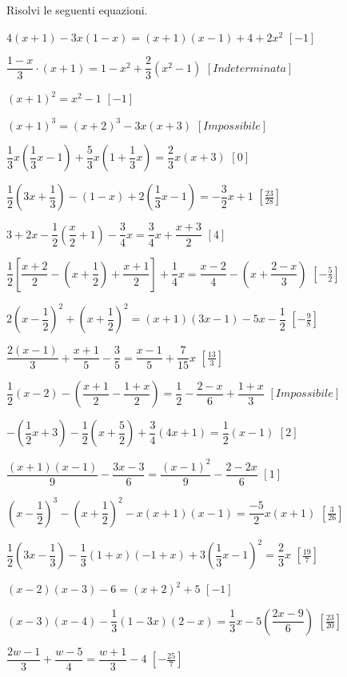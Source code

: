\begin{esercizio}[\Ast]
\label{ese:13.38}
Risolvi le seguenti equazioni.
\begin{enumeratea}
\spazielenx
 \item $4(x+1)-3x(1-x)=(x+1)(x-1)+4+2x^{2}$ \hfill $\left[-1\right]$
 \item $\dfrac{1-x}{3}\cdot (x+1)=1-x^{2}+\dfrac{2}{3}\left(x^{2}-1\right)$ 
  \hfill $\left[Indeterminata\right]$
 \item $(x+1)^{2}=x^{2}-1$ \hfill $\left[-1\right]$
 \item $(x+1)^{3}=(x+2)^{3}-3x(x+3)$ \hfill $\left[Impossibile\right]$
 \item $\dfrac{1}{3}x\left(\dfrac{1}{3}x-1\right)+
        \dfrac{5}{3}x\left(1+\dfrac{1}{3}x\right)=\dfrac{2}{3}x(x+3)$ 
         \hfill $\left[0\right]$
 \item $\dfrac{1}{2}\left(3x+\dfrac{1}{3}\right)-
        (1-x)+2\left(\dfrac{1}{3}x-1\right)=-{\dfrac{3}{2}}x+1$ 
         \hfill $\left[\frac{23}{28}\right]$
 \item $3+2x-\dfrac{1}{2}\left(\dfrac{x}{2}+1\right)-\dfrac{3}{4}x=
        \dfrac{3}{4}x+\dfrac{x+3}{2}$ \hfill $\left[4\right]$
 \item $\dfrac{1}{2}\left[\dfrac{x+2}{2}-\left(x+\dfrac{1}{2}\right)+
        \dfrac{x+1}{2}\right]+\dfrac{1}{4}x=
        \dfrac{x-2}{4}-\left(x+\dfrac{2-x}{3}\right)$ 
  \hfill $\left[-{\frac{5}{2}}\right]$
 \item $2\left(x-\dfrac{1}{2}\right)^{2}+\left(x+\dfrac{1}{2}\right)^{2}
        =(x+1)(3x-1)-5x-\dfrac{1}{2}$ \hfill $\left[-{\frac{9}{8}}\right]$
 \item $\dfrac{2\left(x-1\right)}{3}+\dfrac{x+1}{5}-\dfrac{3}{5}=
        \dfrac{x-1}{5}+\dfrac{7}{15}x$ \hfill $\left[\frac{13}{3}\right]$
 \item $\dfrac{1}{2}(x-2)-\left(\dfrac{x+1}{2}-\dfrac{1+x}{2}\right)=
        \dfrac{1}{2}-\dfrac{2-x}{6}+\dfrac{1+x}{3}$ 
  \hfill $\left[Impossibile\right]$
 \item $-\left(\dfrac{1}{2}x+3\right)-\dfrac{1}{2}\left(x+\dfrac{5}{2}\right)+
        \dfrac{3}{4}(4x+1)=\dfrac{1}{2}(x-1)$ \hfill $\left[2\right]$
 \item $\dfrac{(x+1)(x-1)}{9}-\dfrac{3x-3}{6}=
        \dfrac{(x-1)^{2}}{9}-\dfrac{2-2x}{6}$ \hfill $\left[1\right]$
 \item $\left(x-\dfrac{1}{2}\right)^{3}-
        \left(x+\dfrac{1}{2}\right)^{2}-x(x+1)(x-1)=\dfrac{-5}{2}x(x+1)$ 
  \hfill $\left[\frac{3}{26}\right]$
 \item $\dfrac{1}{2}\left(3x-\dfrac{1}{3}\right)-
        \dfrac{1}{3}(1+x)(-1+x)+3\left(\dfrac{1}{3}x-1\right)^{2}=
        \dfrac{2}{3}x$ \hfill $\left[\frac{19}{7}\right]$
 \item $(x-2)(x-3)-6=(x+2)^2 +5$ \hfill $\left[-1\right]$
 \item $(x-3)(x-4)-\dfrac{1}{3}(1-3x)(2-x)=
        \dfrac{1}{3}x-5\left(\dfrac{2x-9}{6}\right)$ 
  \hfill $\left[\frac{23}{20}\right]$
 \item $\dfrac{2w-1}{3}+\dfrac{w-5}{4}=\dfrac{w+1}{3}-4$ 
  \hfill $\left[-\frac{25}{7}\right]$
\end{enumeratea}
\end{esercizio}

